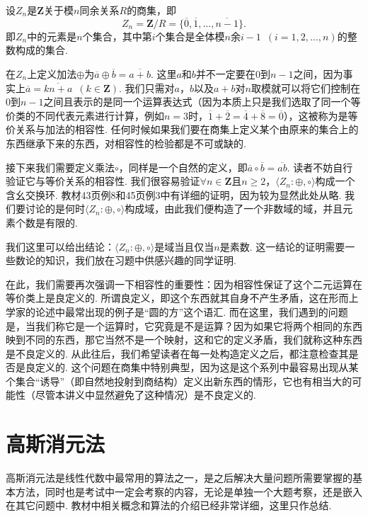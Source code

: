 \begin{example}\label{ex:1:有限域}
    设$Z_n$是$\mathbf{Z}$关于模$n$同余关系$R$的商集，即
    \[Z_n=\mathbf{Z}/R=\{\overline{0},\overline{1},\ldots,\overline{n-1}\}.\]
    即$Z_n$中的元素是$n$个集合，其中第$i$个集合是全体模$n$余$i-1\enspace(i=1,2,\ldots,n)$的整数构成的集合.

    在$Z_n$上定义加法$\oplus$为$\overline{a}\oplus\overline{b}=\overline{a+b}$. 这里$a$和$b$并不一定要在$0$到$n-1$之间，因为事实上$\overline{a}=\overline{kn+a}\enspace(k\in\mathbf{Z})$. 我们只需对$a$，$b$以及$a+b$对$n$取模就可以将它们控制在$0$到$n-1$之间且表示的是同一个运算表达式（因为本质上只是我们选取了同一个等价类的不同代表元素进行计算，例如$n=3$时，$\overline{1}+\overline{2}=\overline{4}+\overline{8}=\overline{0}$），这被称为是等价关系与加法的相容性. 任何时候如果我们要在商集上定义某个由原来的集合上的东西继承下来的东西，对相容性的检验都是不可或缺的.

    接下来我们需要定义乘法$\circ$，同样是一个自然的定义，即$\overline{a}\circ\overline{b}=\overline{ab}$. 读者不妨自行验证它与等价关系的相容性. 我们很容易验证$\forall n\in\mathbf{Z}$且$n\geqslant 2$，$\langle Z_n:\oplus,\circ\rangle$构成一个含幺交换环. 教材43页例8和45页例3中有详细的证明，因为较为显然此处从略. 我们要讨论的是何时$\langle Z_n:\oplus,\circ\rangle$构成域，由此我们便构造了一个非数域的域，并且元素个数是有限的.

    我们这里可以给出结论：$\langle Z_n:\oplus,\circ\rangle$是域当且仅当$n$是素数. 这一结论的证明需要一些数论的知识，我们放在习题中供感兴趣的同学证明.
\end{example}

在此，我们需要再次强调一下相容性的重要性：因为相容性保证了这个二元运算在等价类上是良定义的. 所谓良定义，即这个东西就其自身不产生矛盾，这在形而上学家的论述中最常出现的例子是``圆的方''这个语汇. 而在这里，我们遇到的问题是，当我们称它是一个运算时，它究竟是不是运算？因为如果它将两个相同的东西映到不同的东西，那它当然不是一个映射，这和它的定义矛盾，我们就称这种东西是不良定义的. 从此往后，我们希望读者在每一处构造定义之后，都注意检查其是否是良定义的. 这个问题在商集中特别典型，因为这是这个系列中最容易出现从某个集合``诱导''（即自然地投射到商结构）定义出新东西的情形，它也有相当大的可能性（尽管本讲义中显然避免了这种情况）是不良定义的.

\section{高斯消元法}

高斯消元法是线性代数中最常用的算法之一，是之后解决大量问题所需要掌握的基本方法，同时也是考试中一定会考察的内容，无论是单独一个大题考察，还是嵌入在其它问题中. 教材中相关概念和算法的介绍已经非常详细，这里只作总结.


